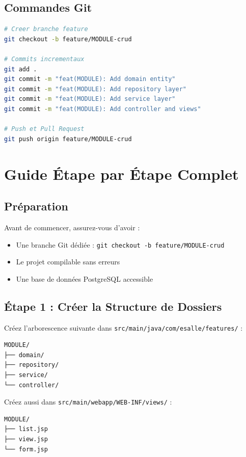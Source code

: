 \documentclass[12pt,a4paper]{article}
\begin{document}
\subsection{Commandes Git}

\begin{lstlisting}[language=bash, caption=Workflow Git]
# Creer branche feature
git checkout -b feature/MODULE-crud

# Commits incrementaux
git add .
git commit -m "feat(MODULE): Add domain entity"
git commit -m "feat(MODULE): Add repository layer"
git commit -m "feat(MODULE): Add service layer"
git commit -m "feat(MODULE): Add controller and views"

# Push et Pull Request
git push origin feature/MODULE-crud
\end{lstlisting}

\newpage

\section{Guide Étape par Étape Complet}

\subsection{Préparation}

Avant de commencer, assurez-vous d'avoir :
\begin{itemize}
    \item Une branche Git dédiée : \texttt{git checkout -b feature/MODULE-crud}
    \item Le projet compilable sans erreurs
    \item Une base de données PostgreSQL accessible
\end{itemize}

\subsection{Étape 1 : Créer la Structure de Dossiers}

Créez l'arborescence suivante dans \texttt{src/main/java/com/esalle/features/} :

\begin{verbatim}
MODULE/
├── domain/
├── repository/
├── service/
└── controller/
\end{verbatim}

Créez aussi dans \texttt{src/main/webapp/WEB-INF/views/} :

\begin{verbatim}
MODULE/
├── list.jsp
├── view.jsp
└── form.jsp
\end{verbatim}
\end{document}
